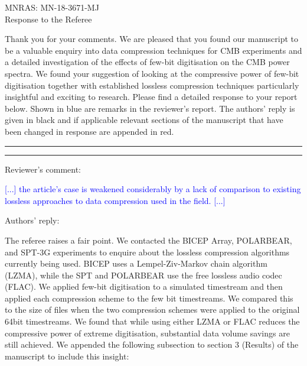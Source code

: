\documentclass{article}
\newcommand{\question}[1]{\textcolor{Blue}{#1}}
\newlength\tindent
\renewcommand{\indent}{\hspace*{\tindent}}
\begin{document}


\begin{center}
\Large MNRAS: MN-18-3671-MJ\\Response to the Referee
\end{center}

Thank you for your comments. We are pleased that you found our manuscript to be a valuable enquiry into data compression techniques for CMB experiments and a detailed investigation of the effects of few-bit digitisation on the CMB power spectra. We found your suggestion of looking at the compressive power of few-bit digitisation together with established lossless compression techniques particularly insightful and exciting to research. Please find a detailed response to your report below. Shown in blue are remarks in the reviewer's report. The authors' reply is given in black and if applicable relevant sections of the manuscript that have been changed in response are appended in red.

\vspace{0.5cm}

\hrule
\vspace{0.1cm}
\hrule

\vspace{0.5cm}

Reviewer's comment:

\indent \question{[...] the article's case is weakened considerably by a lack of comparison to existing lossless approaches to data compression used in the field. [...]}

\vspace{0.25cm}

Authors' reply:

\indent The referee raises a fair point. We contacted the BICEP Array, POLARBEAR, and SPT-3G experiments to enquire about the lossless compression algorithms currently being used. BICEP uses a Lempel-Ziv-Markov chain algorithm (LZMA), while the SPT and POLARBEAR use the free lossless audio codec (FLAC). We applied few-bit digitisation to a simulated timestream and then applied each compression scheme to the few bit timestreams. 
We compared this to the size of files when the two compression schemes were applied to the original 64bit timestreams. 
We found that while using either LZMA or FLAC reduces the compressive power of extreme digitisation, substantial data volume savings are still achieved. We appended the following subsection to section 3 (Results) of the manuscript to include this insight:
\end{document}

